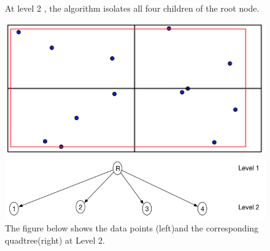 \documentclass{article}
\begin{document}
\begin{figure}[H]

At level 2 , the algorithm isolates all four children of the root node.

  \centering
  \begin{minipage}[b]{0.35\textwidth}
    \includegraphics[width=\textwidth]{4Quad1_2}  
  \end{minipage}
  \hfill
  \begin{minipage}[b]{0.6\textwidth}
    \includegraphics[width=\textwidth]{1_1Quad_2_tree}
  \end{minipage}
  \caption{The figure below shows the data points (left)and the corresponding quadtree(right) at Level 2.}
\end{figure}

\vspace{2cm}
\end{document}
